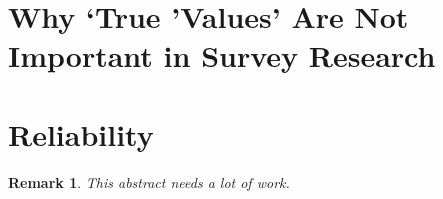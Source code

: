 \documentclass[11pt,twoside]{article}
\newtheorem{remark}{Remark}
\newcommand{\SR}{Survey Research}
\begin{document}
\begin{abstract}
The second part of the paper examines the notion of validity as used
in \SR{}.  Suffice it to say that vocabulary of validity in the social
sciences, especially psychology and education research, is very,
\textit{very} confused.  Generally speaking, the term is used to
refer, not to inferences and their properties, but to referential
relations.  Classic definitions of validity in the social sciences
usually say something like ``measures what it purports to measure'',
which is to say, measurement expressions (e.g. ``2.3 meters'')
\textit{refer} to entities (properties, relations) in the world.  But
it is also used to refer to inferences and a variety of other
concepts.



The connection between the first and second parts is that the social
sciences usually treat validity as a substantial property.  Theories
of validity often take on a metaphysical hue; they attempt to say what
validity \textit{is}, as if it were some kind of entity or substance
-- validity stuff -- that referring terms ``have'', possibly in
greater or lesser degrees.  On the deflationary view, this is a
mistake that inevitably leads to unresolvable problems.

\end{abstract}

\newpage
\section{Why `True 'Values' Are Not Important in Survey Research}

\begin{abstract}
See \cite{brandom_why_2009}
\end{abstract}

\newpage
\section{Reliability}

\begin{remark}
  This abstract needs a lot of work.
\end{remark}
\end{document}
